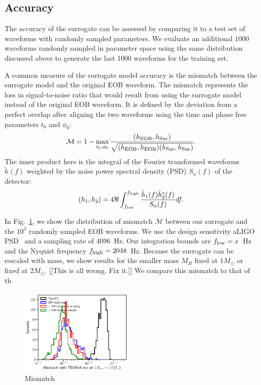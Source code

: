 \documentclass[prd,aps,letter,twocolumn,floatfix,notitlepage,nofootinbib]{revtex4-1}
\begin{document}
\subsection{Accuracy}

The accuracy of the surrogate can be assessed by comparing it to a test set of waveforms with randomly sampled parameters. We evaluate an additional 1000 waveforms randomly sampled in parameter space using the same distribution discussed above to generate the last 1000 waveforms for the training set.

A common measure of the surrogate model accuracy is the mismatch between 
the surrogate model and the original EOB waveform.
The mismatch represents the loss in signal-to-noise ratio that would result 
from using the surrogate model instead of the original EOB waveform. 
It is defined by the deviation from a perfect overlap after aligning the two waveforms
using the time and phase free parameters $t_0$ and $\phi_0$:
\begin{equation}
\mathcal{M} = 1 - \max_{t_0, \phi_0} \frac{(h_{\rm EOB}, h_{\rm Sur})} {\sqrt{(h_{\rm EOB}, h_{\rm EOB}) (h_{\rm Sur}, h_{\rm Sur})}}.
\end{equation}
The inner product here  is the integral of the Fourier transformed waveforms $\tilde h(f)$ weighted by the noise power spectral 
density (PSD) $S_n(f)$ of the detector:
\begin{equation}
(h_1, h_2) = 4 \Re \int_{f_{\rm low}}^{f_{\rm high}} \frac{\tilde h_1(f) \tilde h^*_2(f)} {S_n(f)} df.
\end{equation}

In Fig.~\ref{fig:mismatch}, we show the distribution of mismatch $\mathcal{M}$ between our surrogate
and the $10^3$ randomly sampled EOB waveforms. We use the design sensitivity aLIGO PSD~\cite{Aasi:2013wya} and
a sampling rate of 4096~Hz. Our integration bounds are $f_{\rm low} = x$~Hz and the Nyquist frequency
$f_{\rm high} = 2048$~Hz. Because the surrogate can be rescaled with mass,
we show results for the smaller mass $M_B$ fixed at $1M_\odot$ or fixed at $2M_\odot$.
[[This is all wrong. Fix it.]]
We compare this mismatch to that of th

\begin{figure}[htb]
\centering
\includegraphics[width=0.49\textwidth]{mismatch.png}
\caption{Mismatch}
\label{fig:mismatch}
\end{figure}
\end{document}
